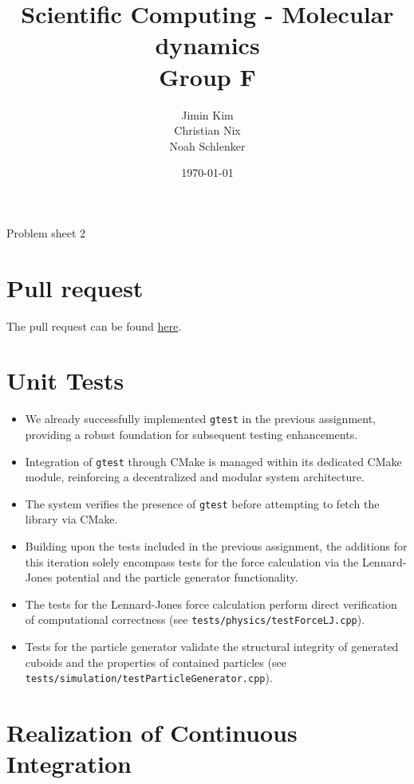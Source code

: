 \documentclass{article}
\title{Scientific Computing - Molecular dynamics \\ Group F}
\author{
    Jimin Kim \\
    Christian Nix \\
    Noah Schlenker
}
\date{\today}
\newcommand{\subtitle}{Problem sheet 2}
\begin{document}
\maketitle

\begin{center}
    \LARGE \subtitle{}
\end{center}

\section{Pull request}
\label{sec:pr}
The pull request can be found \href{https://github.com/noahpy/MolSim-SS24/pull/10}{here}.

\section{Unit Tests}
\label{sec:ut}

\begin{itemize}
    \item We already successfully implemented \verb|gtest| in the previous assignment, providing a robust foundation for subsequent testing enhancements.
    \item Integration of \verb|gtest| through CMake is managed within its dedicated CMake module, reinforcing a decentralized and modular system architecture.
    \item The system verifies the presence of \verb|gtest| before attempting to fetch the library via CMake.
    \item Building upon the tests included in the previous assignment, the additions for this iteration solely encompass tests for the force calculation via the Lennard-Jones potential and the particle generator functionality.
    \item The tests for the Lennard-Jones force calculation perform direct verification of computational correctness (see \texttt{tests/physics/testForceLJ.cpp}).
    \item Tests for the particle generator validate the structural integrity of generated cuboids and the properties of contained particles \newline(see \texttt{tests/simulation/testParticleGenerator.cpp}).
\end{itemize}

\section{Realization of Continuous Integration}
\label{sec:ci}
\end{document}
